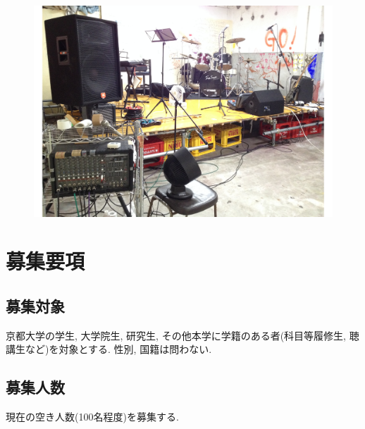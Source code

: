 \documentclass[10pt,b5jsbook,dvips,dvipdfmx,openany]{jsbook}
\theoremstyle{definition}
\begin{document}
    \begin{figure}[h]
    		\begin{flushleft}
     	 	\includegraphics[scale=0.3]{muc.pdf}
    		\end{flushleft}
    		\end{figure}


\newpage
	\section{募集要項} \label{sec:gl}
		\subsection{募集対象}
		京都大学の学生, 大学院生, 研究生, その他本学に学籍のある者(科目等履修生, 聴講生など)を対象とする. 性別, 国籍は問わない.

		\subsection{募集人数}
		現在の空き人数(100名程度)を募集する.
\end{document}
